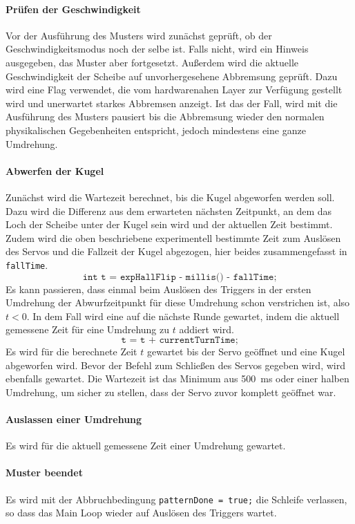 \documentclass{kis}
\begin{document}
\paragraph{Prüfen der Geschwindigkeit}
Vor der Ausführung des Musters wird zunächst geprüft, ob der Geschwindigkeitsmodus noch der selbe ist. Falls nicht, wird ein Hinweis ausgegeben, das Muster aber fortgesetzt. Außerdem wird die aktuelle Geschwindigkeit der Scheibe auf unvorhergesehene Abbremsung geprüft. Dazu wird eine Flag verwendet, die vom hardwarenahen Layer zur Verfügung gestellt wird und unerwartet starkes Abbremsen anzeigt. Ist das der Fall, wird mit die Ausführung des Musters pausiert bis die Abbremsung wieder den normalen physikalischen Gegebenheiten entspricht, jedoch mindestens eine ganze Umdrehung.

\paragraph{Abwerfen der Kugel}
Zunächst wird die Wartezeit berechnet, bis die Kugel abgeworfen werden soll. Dazu wird die Differenz aus dem erwarteten nächsten Zeitpunkt, an dem das Loch der Scheibe unter der Kugel sein wird und der aktuellen Zeit bestimmt. Zudem wird die oben beschriebene experimentell bestimmte Zeit zum Auslösen des Servos und die Fallzeit der Kugel abgezogen, hier beides zusammengefasst in \texttt{fallTime}.
$$\texttt{int t = expHallFlip - millis() - fallTime;}$$
Es kann passieren, dass einmal beim Auslösen des Triggers in der ersten Umdrehung der Abwurfzeitpunkt für diese Umdrehung schon verstrichen ist, also $t < 0$. In dem Fall wird eine auf die nächste Runde gewartet, indem die aktuell gemessene Zeit für eine Umdrehung zu $t$ addiert wird.
$$\texttt{t = t + currentTurnTime;}$$
Es wird für die berechnete Zeit $t$ gewartet bis der Servo geöffnet und eine Kugel abgeworfen wird. Bevor der Befehl zum Schließen des Servos gegeben wird, wird ebenfalls gewartet. Die Wartezeit ist das Minimum aus 500~ms oder einer halben Umdrehung, um sicher zu stellen, dass der Servo zuvor komplett geöffnet war.

\paragraph{Auslassen einer Umdrehung}
Es wird für die aktuell gemessene Zeit einer Umdrehung gewartet.

\paragraph{Muster beendet}
Es wird mit der Abbruchbedingung \texttt{patternDone = true;} die Schleife verlassen, so dass das Main Loop wieder auf Auslösen des Triggers wartet.
\end{document}
